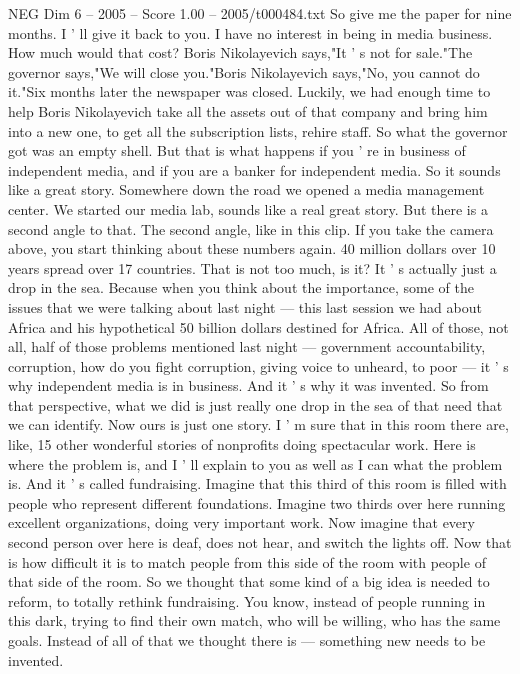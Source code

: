 \begin{textsample}{NEG Dim 6 – 2005 – Score 1.00 – 2005/t000484.txt}
So give me the paper for nine months.
I ' ll give it back to you.
I have no interest in being in media business.
How much would that cost?
Boris Nikolayevich says,"It ' s not for sale."The governor says,"We will close you."Boris Nikolayevich says,"No, you cannot do it."Six months later the newspaper was closed.
Luckily, we had enough time to help Boris Nikolayevich take all the assets out of that company and bring him into a new one, to get all the subscription lists, rehire staff.
So what the governor got was an empty shell.
But that is what happens if you ' re in business of independent media, and if you are a banker for independent media.
So it sounds like a great story.
Somewhere down the road we opened a media management center.
We started our media lab, sounds like a real great story.
But there is a second angle to that.
The second angle, like in this clip.
If you take the camera above, you start thinking about these numbers again. 40 million dollars over 10 years spread over 17 countries.
That is not too much, is it?
It ' s actually just a drop in the sea.
Because when you think about the importance, some of the issues that we were talking about last night — this last session we had about Africa and his hypothetical 50 billion dollars destined for Africa.
All of those, not all, half of those problems mentioned last night — government accountability, corruption, how do you fight corruption, giving voice to unheard, to poor — it ' s why independent media is in business.
And it ' s why it was invented.
So from that perspective, what we did is just really one drop in the sea of that need that we can identify.
Now ours is just one story.
I ' m sure that in this room there are, like, 15 other wonderful stories of nonprofits doing spectacular work.
Here is where the problem is, and I ' ll explain to you as well as I can what the problem is.
And it ' s called fundraising.
Imagine that this third of this room is filled with people who represent different foundations.
Imagine two thirds over here running excellent organizations, doing very important work.
Now imagine that every second person over here is deaf, does not hear, and switch the lights off.
Now that is how difficult it is to match people from this side of the room with people of that side of the room.
So we thought that some kind of a big idea is needed to reform, to totally rethink fundraising.
You know, instead of people running in this dark, trying to find their own match, who will be willing, who has the same goals.
Instead of all of that we thought there is — something new needs to be invented.

\end{textsample}
